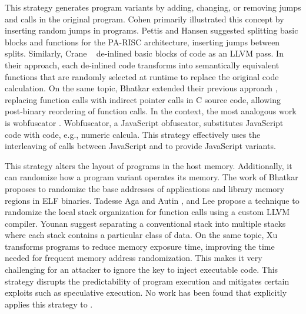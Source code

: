 \begin{strategy}
    \label{jumps}
    This strategy generates program variants by adding, changing, or removing jumps and calls in the original program. 
    Cohen \cite{cohen1993operating} primarily illustrated this concept by inserting random jumps in programs. Pettis and Hansen \cite{pettisochhansen} suggested splitting basic blocks and functions for the PA-RISC architecture, inserting jumps between splits.
    Similarly, Crane \etal~\cite{crane2015thwarting} de-inlined basic blocks of code as an LLVM pass. 
    In their approach, each de-inlined code transforms into semantically equivalent functions that are randomly selected at runtime to replace the original code calculation. 
    On the same topic, Bhatkar \etal \cite{bhatkar2005efficient} extended their previous approach \cite{bhatkar03}, replacing function calls with indirect pointer calls in C source code, allowing post-binary reordering of function calls. 
    In the \Wasm context, the most analogous work is wobfuscator \cite{wobfuscator}.
    Wobfuscator, a JavaScript obfuscator, substitutes JavaScript code with \Wasm code, e.g., numeric calcula.
    This strategy effectively uses the interleaving of calls between JavaScript and \Wasm to provide JavaScript variants.
\end{strategy}


\begin{strategy}
    \label{mem_strategy}
    This strategy alters the layout of programs in the host memory. 
    Additionally, it can randomize how a program variant operates its memory. 
    The work of Bhatkar \etal \cite{bhatkar03, bhatkar2005efficient} proposes to randomize the base addresses of applications and library memory regions in ELF binaries. 
    Tadesse Aga and Autin \cite{aga2019smokestack}, and Lee \etal \cite{lee2021savior} propose a technique to randomize the local stack organization for function calls using a custom LLVM compiler.
    Younan \etal \cite{Younan2006} suggest separating a conventional stack into multiple stacks where each stack contains a particular class of data. 
    On the same topic, Xu \etal \cite{xu2020merr} transforms programs to reduce memory exposure time, improving the time needed for frequent memory address randomization. 
    This makes it very challenging for an attacker to ignore the key to inject executable code. 
    This strategy disrupts the predictability of program execution and mitigates certain exploits such as speculative execution.
    No work has been found that explicitly applies this strategy to \Wasm.
\end{strategy}

